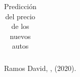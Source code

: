 \documentclass[11pt,letterpaper]{article}\usepackage[]{graphicx}\usepackage[]{color}
\begin{document}
\begin{enumerate}
\begin{table}[H]
\begin{tabular}{|c|c|c|c|c|}
        \end{tabular}
        \caption{Predicción del precio de los nuevos autos}
        

        \label{tab:my_label}
    \end{table}
\end{enumerate}
\begin{thebibliography}{1} %
 Ramos David,
,
\newblock  (2020).

\end{thebibliography}
\end{document}
